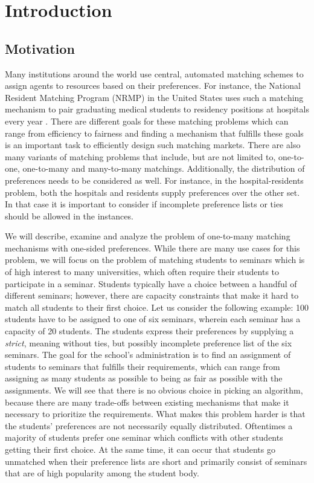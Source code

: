 \section{Introduction}
\label{sec:introduction}

\subsection{Motivation}
Many institutions around the world use central, automated matching schemes to assign agents to resources based on their preferences. For instance, the National Resident Matching Program (NRMP) in the United States uses such a matching mechanism to pair graduating medical students to residency positions at hospitals every year \cite{Roth-NRMP}. There are different goals for these matching problems which can range from efficiency to fairness and finding a mechanism that fulfills these goals is an important task to efficiently design such matching markets.
There are also many variants of matching problems that include, but are not limited to, one-to-one, one-to-many and many-to-many matchings. Additionally, the distribution of preferences needs to be considered as well. For instance, in the hospital-residents problem, both the hospitals and residents supply preferences over the other set. In that case it is important to consider if incomplete preference lists or ties should be allowed in the instances. 

We will describe, examine and analyze the problem of one-to-many matching mechanisms with one-sided preferences. While there are many use cases for this problem, we will focus on the problem of matching students to seminars which is of high interest to many universities, which often require their students to participate in a seminar. Students typically have a choice between a handful of different seminars; however, there are capacity constraints that make it hard to match all students to their first choice. Let us consider the following example: 100 students have to be assigned to one of six seminars, wherein each seminar has a capacity of 20 students. The students express their preferences by supplying a \emph{strict}, meaning without ties, but possibly incomplete preference list of the six seminars. The goal for the school's administration is to find an assignment of students to seminars that fulfills their requirements, which can range from assigning as many students as possible to being as fair as possible with the assignments. We will see that there is no obvious choice in picking an algorithm, because there are many trade-offs between existing mechanisms that make it necessary to prioritize the requirements.  
What makes this problem harder is that the students' preferences are not necessarily equally distributed. Oftentimes a majority of students prefer one seminar which conflicts with other students getting their first choice. At the same time, it can occur that students go unmatched when their preference lists are short and primarily consist of seminars that are of high popularity among the student body.

